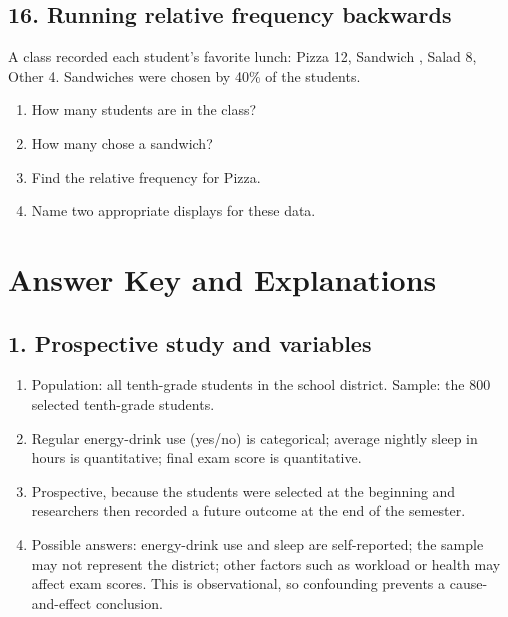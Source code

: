 \documentclass[11pt]{article}
\newcommand{\ans}[1]{\textcolor{AnswerBlue}{#1}}
\begin{document}
\Needspace{1.9in}
\subsection*{16. Running relative frequency backwards}
A class recorded each student's favorite lunch: Pizza 12, Sandwich \underline{\hspace{0.4in}}, Salad 8, Other 4. Sandwiches were chosen by 40\% of the students.
\begin{enumerate}[label=\alph*.]
  \item How many students are in the class?\\[0.25in]
  \item How many chose a sandwich?\\[0.25in]
  \item Find the relative frequency for Pizza.\\[0.25in]
  \item Name two appropriate displays for these data.\\[0.2in]
\end{enumerate}

\newpage
\section{Answer Key and Explanations}

\subsection*{1. Prospective study and variables}
\begin{answerbox}
\begin{enumerate}[label=\alph*.]
  \item \ans{Population: all tenth-grade students in the school district. Sample: the 800 selected tenth-grade students.}
  \item \ans{Regular energy-drink use (yes/no) is categorical; average nightly sleep in hours is quantitative; final exam score is quantitative.}
  \item \ans{Prospective, because the students were selected at the beginning and researchers then recorded a future outcome at the end of the semester.}
  \item \ans{Possible answers: energy-drink use and sleep are self-reported; the sample may not represent the district; other factors such as workload or health may affect exam scores. This is observational, so confounding prevents a cause-and-effect conclusion.}
\end{enumerate}
\end{answerbox}
\end{document}

